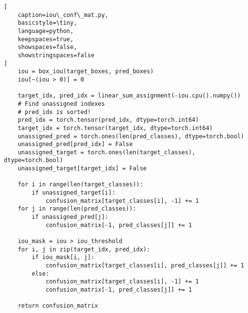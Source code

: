 \begin{lstlisting}[
    caption=iou\_conf\_mat.py,
    basicstyle=\tiny,
    language=python,
    keepspaces=true,
    showspaces=false,
    showstringspaces=false
]
    iou = box_iou(target_boxes, pred_boxes)
    iou[~(iou > 0)] = 0

    target_idx, pred_idx = linear_sum_assignment(-iou.cpu().numpy())
    # Find unassigned indexes
    # pred_idx is sorted!
    pred_idx = torch.tensor(pred_idx, dtype=torch.int64)
    target_idx = torch.tensor(target_idx, dtype=torch.int64)
    unassigned_pred = torch.ones(len(pred_classes), dtype=torch.bool)
    unassigned_pred[pred_idx] = False
    unassigned_target = torch.ones(len(target_classes), dtype=torch.bool)
    unassigned_target[target_idx] = False

    for i in range(len(target_classes)):
        if unassigned_target[i]:
            confusion_matrix[target_classes[i], -1] += 1
    for j in range(len(pred_classes)):
        if unassigned_pred[j]:
            confusion_matrix[-1, pred_classes[j]] += 1

    iou_mask = iou > iou_threshold
    for i, j in zip(target_idx, pred_idx):
        if iou_mask[i, j]:
            confusion_matrix[target_classes[i], pred_classes[j]] += 1
        else:
            confusion_matrix[target_classes[i], -1] += 1
            confusion_matrix[-1, pred_classes[j]] += 1

    return confusion_matrix
\end{lstlisting}

